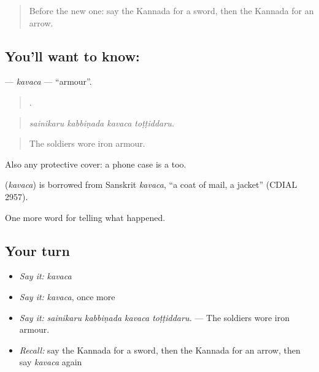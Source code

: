 \label{lesson:KA-C349-kavaca}



\begin{quote}
Before the new one: say the Kannada for a sword, then the Kannada for an arrow.
\end{quote}

\subsection*{You'll want to know: }
\textbf{} — \emph{kavaca} — \textquotedblleft{}armour\textquotedblright{}.

\begin{quote}
   .
\end{quote}

\begin{quote}
\emph{sainikaru kabbiṇada kavaca toṭṭiddaru.}
\end{quote}

\begin{quote}
The soldiers wore iron armour.
\end{quote}

Also any protective cover: a phone case is a  too.

\begin{cousinweb}
\textbf{} (\emph{kavaca}) is borrowed from Sanskrit \emph{kavaca}, \textquotedblleft{}a coat of mail, a jacket\textquotedblright{} (CDIAL 2957).
\end{cousinweb}

\begin{grammarlens}[title={What you've built}]
One more word for telling what happened.
\end{grammarlens}

\subsection*{Your turn}
\begin{itemize}
\raggedright
  \item \emph{Say it:} \emph{kavaca}
  \item \emph{Say it:} \emph{kavaca}, once more
  \item \emph{Say it:} \emph{sainikaru kabbiṇada kavaca toṭṭiddaru.} — The soldiers wore iron armour.
  \item \emph{Recall:} say the Kannada for a sword, then the Kannada for an arrow, then say \emph{kavaca} again
\end{itemize}

